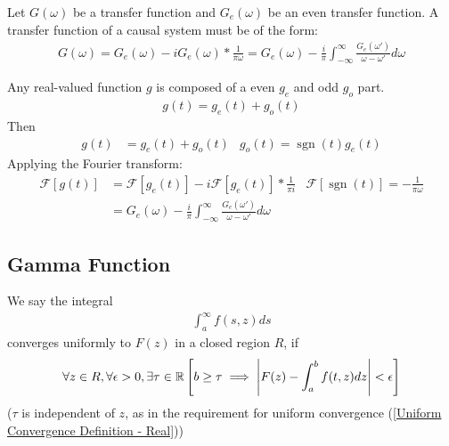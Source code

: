 \documentclass[12pt, english]{book}
\makeatletter
\renewenvironment{proof}[1][\proofname]{\par
	\pushQED{\qed}%
	\normalfont \topsep6\p@\@plus6\p@\relax
	\list{}{%
		\settowidth{\leftmargin}{\itshape\proofname:\hskip\labelsep}%
		\setlength{\labelwidth}{0pt}%
		\setlength{\itemindent}{-\leftmargin}%
	}%
	\item[\hskip\labelsep\itshape#1\@addpunct{:}]\ignorespaces
	}{ \popQED\endlist\@endpefalse}
\makeatother
\begin{document}
	\begin{theorem}
		\label{Hilbert Transform and Causal System Theorem - Complex}
		Let \(G(\omega)\) be a transfer function and \(G_e(\omega)\) be an even transfer function. A transfer function of a causal system must be of the form: 
		\begin{align*}
			G(\omega)= G_e(\omega) - iG_e(\omega) \ast \frac{1}{\pi \omega} 
				= G_e(\omega) - \frac{i}{\pi} \int_{-\infty}^{\infty} \frac{G_e(\omega')}{\omega - \omega'} d\omega
		\end{align*}
	\end{theorem}
	\begin{proof}
		Any real-valued function \(g\) is composed of a even \(g_e\) and odd \(g_o\) part.
		\begin{align*}
			g(t) = g_e(t) + g_o(t)
		\end{align*}
		Then
		\begin{align*}
			g(t) &= g_e (t) + g_o (t)	& g_o(t) = \operatorname{sgn}(t) g_e(t)
		\end{align*}
		Applying the Fourier transform:
		\begin{align*}
			\mathcal{F}[g(t)] 
			&= \mathcal{F}[g_e(t)] - i\mathcal{F}[g_e(t)] \ast \frac{1}{\pi i}
				& \mathcal{F}[\operatorname{sgn}(t)] = -\frac{1}{\pi \omega} \\
			&= G_e(\omega) - \frac{i}{\pi} \int_{-\infty}^{\infty} \frac{G_e(\omega')}{\omega - \omega'} d\omega
		\end{align*}
	\end{proof}
	
	\subsection{Gamma Function} \label{Gamma Function Subsection - Complex}
	
	\begin{definition}
		We say the integral
		\begin{align*}
			\int_{a}^{\infty} f(s, z) ds
		\end{align*}
		converges uniformly to \(F(z)\) in a closed region \(R\), if 
		\begin{align*}
			\forall z \in R, \forall \epsilon > 0, \exists \tau \in \mathbb{R}
			\left[b \geq \tau \implies \abs{F(z) - \int_{a}^{b} f(t,z) dz} < \epsilon \right]
		\end{align*}
		(\(\tau\) is independent of \(z\), as in the requirement for uniform convergence (\cref{Uniform Convergence Definition - Real}))
	\end{definition}
\end{document}
